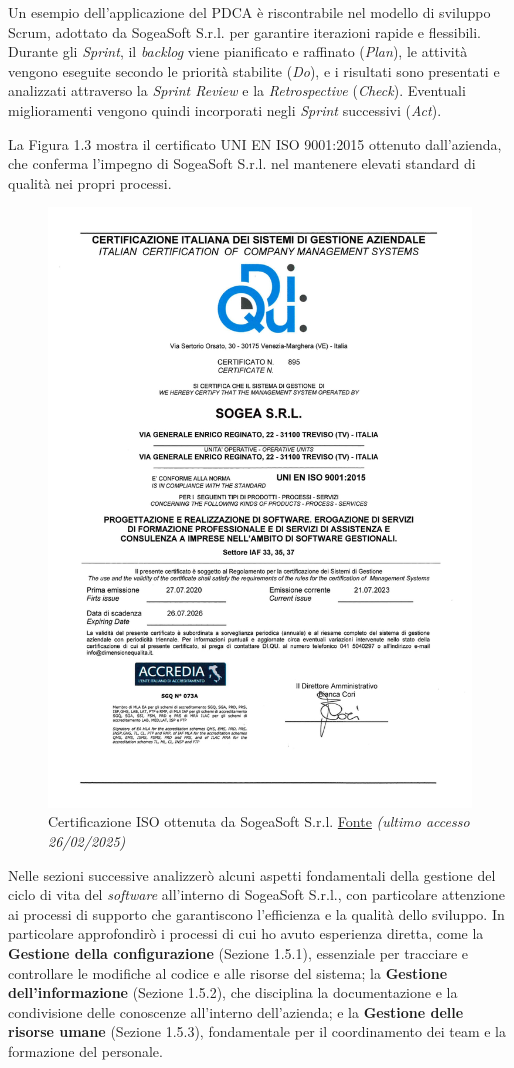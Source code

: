     \noindent Un esempio dell’applicazione del PDCA è riscontrabile nel modello di sviluppo Scrum, adottato da SogeaSoft S.r.l. per garantire iterazioni rapide e flessibili. Durante gli \textit{Sprint}, il \textit{backlog} viene pianificato e raffinato (\textit{Plan}), le attività vengono eseguite secondo le priorità stabilite (\textit{Do}), e i risultati sono presentati e analizzati attraverso la \textit{Sprint Review} e la \textit{Retrospective} (\textit{Check}). Eventuali miglioramenti vengono quindi incorporati negli \textit{Sprint} successivi (\textit{Act}).
    
    \noindent La Figura 1.3 mostra il certificato UNI EN ISO 9001:2015 ottenuto dall’azienda, che conferma l’impegno di SogeaSoft S.r.l. nel mantenere elevati standard di qualità nei propri processi.

    \begin{figure}[H]
        \centering
        \includegraphics[width=0.5\linewidth]{BCS-Tessi/images/CertificatoSogea.jpg}
        \caption{Certificazione ISO ottenuta da SogeaSoft S.r.l. \href{https://sogeasoft.com/p/iso9001}{Fonte}
        \textit{(ultimo accesso 26/02/2025)}}
        \label{fig:certificazione-iso}
    \end{figure}

    \noindent Nelle sezioni successive analizzerò alcuni aspetti fondamentali della gestione del ciclo di vita del \textit{software} all'interno di SogeaSoft S.r.l., con particolare attenzione ai processi di supporto che garantiscono l'efficienza e la qualità dello sviluppo. In particolare approfondirò i processi di cui ho avuto esperienza diretta, come la \textbf{Gestione della configurazione} (Sezione 1.5.1), essenziale per tracciare e controllare le modifiche al codice e alle risorse del sistema; la \textbf{Gestione dell’informazione} (Sezione 1.5.2), che disciplina la documentazione e la condivisione delle conoscenze all'interno dell'azienda; e la \textbf{Gestione delle risorse umane} (Sezione 1.5.3), fondamentale per il coordinamento dei team e la formazione del personale. 
    
